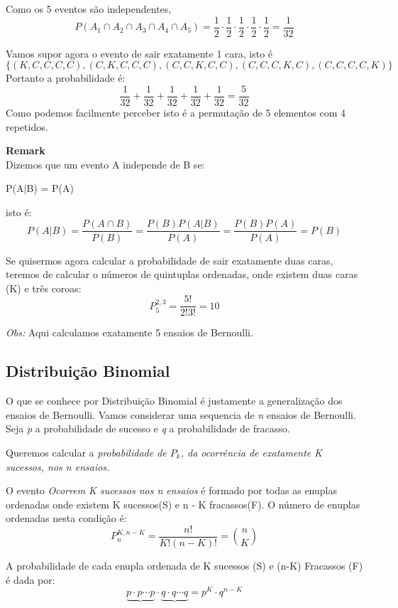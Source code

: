 \documentclass[10pt,a4paper]{article}
\begin{document}
Como os 5 eventos são independentes, \\
\[P(A_{1} \cap A_{2} \cap A_{3} \cap A_{4} \cap A_{5}) = \frac{1}{2} \cdot \frac{1}{2}\cdot \frac{1}{2} \cdot \frac{1}{2} \cdot \frac{1}{2} = \frac{1}{32}\] 

Vamos supor agora o evento de sair exatamente 1 cara, isto é
\[\lbrace(K, C, C, C, C), (C, K, C, C, C), (C, C, K, C, C), (C, C, C, K, C), (C, C, C, C, K) \rbrace\]
Portanto a probabilidade é:
\[\frac{1}{32} + \frac{1}{32} + \frac{1}{32} + \frac{1}{32} + \frac{1}{32} = \frac{5}{32}\]
Como podemos facilmente perceber isto é a permutação de 5 elementos com 4 repetidos.
\begin{mdframed}[linewidth=0.6pt]
	\textbf{Remark}\\
	Dizemos que um evento A independe de B se:
	\begin{center}
		P(A$|$B) = P(A)
	\end{center}
	isto é:
	\[P(A|B) = \frac{P(A \cap B)}{P(B)} = \frac{P(B) P(A|B)}{P(A)} = \frac{P(B)P(A)}{P(A)} = 
	P(B)\]
\end{mdframed}

Se quisermos agora calcular a probabilidade de sair exatamente duas caras, teremos de calcular o números de quintuplas ordenadas, onde existem duas caras (K) e três coroas:
\[P^{2,3}_{5} = \frac{5!}{2!3!} = 10\]

\textit{Obs:} Aqui calculamos exatamente 5 ensaios de Bernoulli.

\subsection{Distribuição Binomial}


O que se conhece por Distribuição Binomial é justamente a generalização dos ensaios de Bernoulli. Vamos considerar uma sequencia de \textit{n} ensaios de Bernoulli. Seja \textit{p} a probabilidade de sucesso e \textit{q} a probabilidade de fracasso.

 Queremos calcular a \emph{probabilidade de $P_{k}$, da ocorrência de exatamente K sucessos, nos n ensaios.}

O evento \textit{Ocorrem K sucessos nos n ensaios} é formado por todas as enuplas ordenadas onde existem K sucessos(S) e n - K fracassos(F). O número de enuplas ordenadas nesta condição é:
\[
	P^{K, n-K}_{n} = \frac{n!}{K!(n-K)!} = \binom{n}{K}
\]

A probabilidade de cada enupla ordenada de K sucessos (S) e (n-K) Fracassos (F) é dada por:
\[
	\underbrace{p \cdot p \cdots p} \cdot \underbrace{q \cdot q \cdots q} = p^{K}\cdot q^{n-K}
\]
\end{document}
